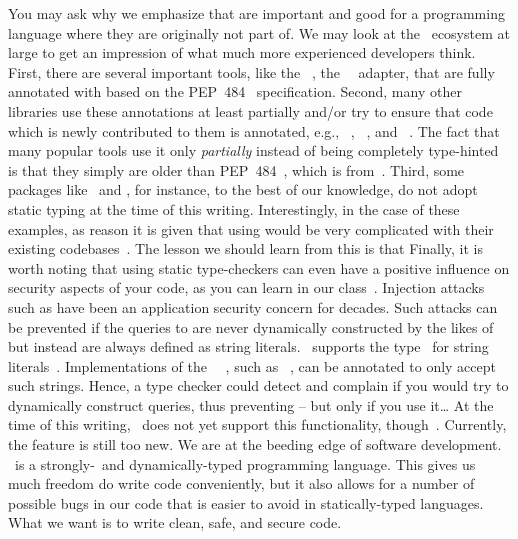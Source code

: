 You may ask why we emphasize that  are important and good for a programming language where they are originally not part of.
We may look at the \python\ ecosystem at large to get an impression of what much more experienced developers think.
First, there are several important tools, like the \psycopg~\cite{VDGE2022PPDAFP:ST}, the \postgresql\ \python\ adapter, that are fully annotated with  based on the PEP~484~\cite{PEP484} specification.
Second, many other libraries use these annotations at least partially and/or try to ensure that code which is newly contributed to them is annotated, e.g., \matplotlib~\cite{HDFDM2012MVWP:CG}, \numpy~\cite{N2025N:TNT}, and \pandas~\cite{PD2025P:CTTCB}.
The fact that many popular tools use it only \emph{partially} instead of being completely type-hinted is that they simply are older than PEP~484~\cite{PEP484}, which is from~\citeyear{PEP484}.
Third, some packages like \scikitlearn\ and \scipy, for instance, to the best of our knowledge, do not adopt static typing at the time of this writing.
Interestingly, in the case of these examples, as reason it is given that using  would be very complicated with their existing codebases~\cite{CFNYLH2020ST,DPVPCHG2018ATHFS}.
The lesson we should learn from this is that%
%
%
%
Finally, it is worth noting that using static type-checkers can even have a positive influence on security aspects of your code, as you can learn in our  class~\cite{databases}.
Injection attacks such as  have been an application security concern for decades.
Such attacks can be prevented if the queries to  are never dynamically constructed by the likes of  but instead are always defined as string literals.
\python\ supports the type~ for string literals~\cite{PEP675}.
Implementations of the \python\ \db\ , such as \psycopg~\cite{VDGE2022PPDAFP:ST}, can be annotated to only accept such strings.
Hence, a type checker could detect and complain if you would try to dynamically construct queries, thus preventing  -- but only if you use it\dots
At the time of this writing, \mypy\ does not yet support this functionality, though~\cite{ZDWVSLS2022I1SP6L,VDGE2022PPDAFP:ST}.
Currently, the feature is still too new.
We are at the beeding edge of software development.%
%
\FloatBarrier%
\endhsection%
%
%
\python\ is a strongly-\ and dynamically-typed programming language.
This gives us much freedom do write code conveniently, but it also allows for a number of possible bugs in our code that is easier to avoid in statically-typed languages.
What we want is to write clean, safe, and secure code.

